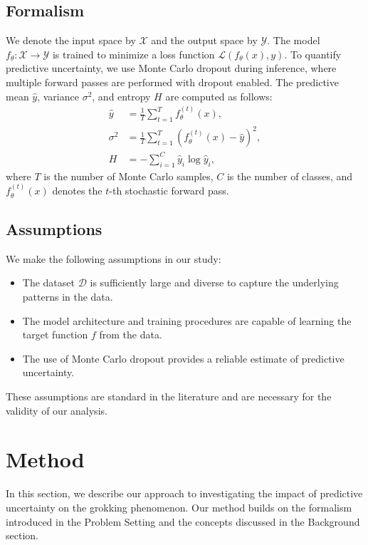 \documentclass{article} %
\begin{document}
\subsection{Formalism}
\label{sec:formalism}
We denote the input space by \( \mathcal{X} \) and the output space by \( \mathcal{Y} \). The model \( f_\theta: \mathcal{X} \to \mathcal{Y} \) is trained to minimize a loss function \( \mathcal{L}(f_\theta(x), y) \). To quantify predictive uncertainty, we use Monte Carlo dropout during inference, where multiple forward passes are performed with dropout enabled. The predictive mean \( \hat{y} \), variance \( \sigma^2 \), and entropy \( H \) are computed as follows:
\begin{align}
    \hat{y} &= \frac{1}{T} \sum_{t=1}^{T} f_\theta^{(t)}(x), \\
    \sigma^2 &= \frac{1}{T} \sum_{t=1}^{T} \left(f_\theta^{\left(t\right)}(x) - \hat{y}\right)^2, \\
    H &= - \sum_{i=1}^{C} \hat{y}_i \log \hat{y}_i,
\end{align}
where \( T \) is the number of Monte Carlo samples, \( C \) is the number of classes, and \( f_\theta^{(t)}(x) \) denotes the \( t \)-th stochastic forward pass.

\subsection{Assumptions}
\label{sec:assumptions}
We make the following assumptions in our study:
\begin{itemize}
    \item The dataset \( \mathcal{D} \) is sufficiently large and diverse to capture the underlying patterns in the data.
    \item The model architecture and training procedures are capable of learning the target function \( f \) from the data.
    \item The use of Monte Carlo dropout provides a reliable estimate of predictive uncertainty.
\end{itemize}
These assumptions are standard in the literature and are necessary for the validity of our analysis.

\section{Method}
\label{sec:method}

In this section, we describe our approach to investigating the impact of predictive uncertainty on the grokking phenomenon. Our method builds on the formalism introduced in the Problem Setting and the concepts discussed in the Background section.
\end{document}
